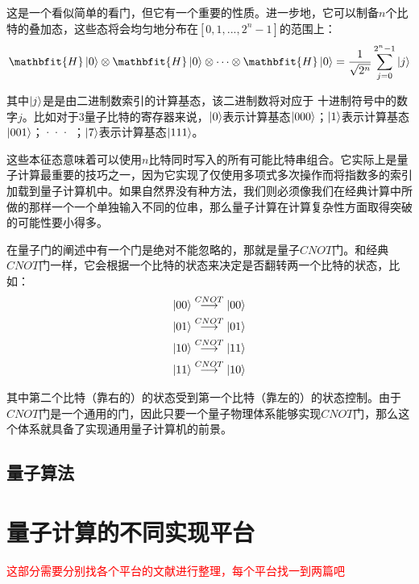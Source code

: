 这是一个看似简单的看门，但它有一个重要的性质。进一步地，它可以制备$n$个比特的叠加态，这些态将会均匀地分布在$[0, 1, ..., 2^n-1]$的范围上：
\begin{align}
    \mathbfit{H}\ket{0}\otimes\mathbfit{H}\ket{0}\otimes\dots\otimes\mathbfit{H}\ket{0}=\frac{1}{\sqrt{2^n}}\sum_{j=0}^{2^n-1}\ket{j}
\end{align}

其中$\ket{j}$是是由二进制数索引的计算基态，该二进制数将对应于 十进制符号中的数字$j$。比如对于$3$量子比特的寄存器来说，$\ket{0}$表示计算基态$\ket{000}$；$\ket{1}$表示计算基态$\ket{001}$；··· ；$\ket{7}$表示计算基态$\ket{111}$。

这些本征态意味着可以使用$n$比特同时写入的所有可能比特串组合。它实际上是量子计算最重要的技巧之一，因为它实现了仅使用多项式多次操作而将指数多的索引加载到量子计算机中。如果自然界没有种方法，我们则必须像我们在经典计算中所做的那样一个一个单独输入不同的位串，那么量子计算在计算复杂性方面取得突破的可能性要小得多。

在量子门的阐述中有一个门是绝对不能忽略的，那就是量子$CNOT$门。和经典$CNOT$门一样，它会根据一个比特的状态来决定是否翻转两一个比特的状态，比如：
\begin{align}
    \ket{00}\overset{CNOT}{\longrightarrow}\ket{00}\\
    \ket{01}\overset{CNOT}{\longrightarrow}\ket{01}\\
    \ket{10}\overset{CNOT}{\longrightarrow}\ket{11}\\
    \ket{11}\overset{CNOT}{\longrightarrow}\ket{10}\\
\end{align}

其中第二个比特（靠右的）的状态受到第一个比特（靠左的）的状态控制。由于$CNOT$门是一个通用的门，因此只要一个量子物理体系能够实现$CNOT$门，那么这个体系就具备了实现通用量子计算机的前景\cite[]{Zajac_Sigillito_Russ_Borjans_Taylor_Burkard_Petta_2018,Zhu_Cheng_Zhu_Chen_Guan_2022}。


\subsection[量子算法]{量子算法}









\section[量子计算的不同实现平台]{量子计算的不同实现平台}
\textcolor{red}{这部分需要分别找各个平台的文献进行整理，每个平台找一到两篇吧}
